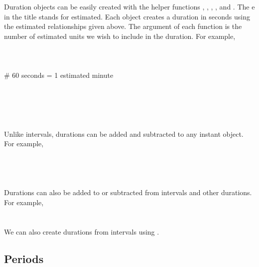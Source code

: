 \documentclass[article]{jss}
\begin{document}
Duration objects can be easily created with the helper functions 
, , , , and  . The e in the title stands for estimated. Each object creates a duration in seconds using the estimated relationships given above. The argument of each function is the number of estimated units we wish to include in the duration. For example,\\

\\
\\

\\
 \# 60 seconds = 1 estimated minute\\

\\
\\

\\
\\
\\

Unlike intervals, durations can be added and subtracted to any instant object. For example,\\

\\
\\

\\
\\

Durations can also be added to or subtracted from intervals and other durations. For example,\\

\\
\\

We can also create durations from intervals using . 



\subsection{Periods}
\label{sec:periods}
\end{document}

